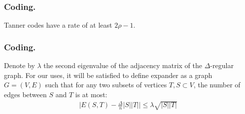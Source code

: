 \documentclass[usenames, aspectratio=169]{beamer}
\begin{document}
\begin{frame}
  \frametitle{Coding.}
\begin{lemma}
\label{tanrate} Tanner codes have a rate of at least $2\rho - 1$.
\end{lemma}

\end{frame}


\begin{frame}
  \frametitle{Coding.}
\begin{definition} Denote by $\lambda$ the second eigenvalue of the adjacency matrix of the $\Delta$-regular graph. For our uses, it will be satisfied to define expander as a graph $G = \left( V,E \right)$ such that for any two subsets of vertices $T,S \subset V$, the number of edges between $S$ and $T$ is at most:
  \begin{equation*}
    \begin{split}
      \mid E\left( S,T \right) - \frac{\Delta}{n}|S||T| \mid \le \lambda\sqrt{|S| |T|} 
    \end{split}
  \end{equation*}
\end{definition}
\end{frame}
\end{document}

